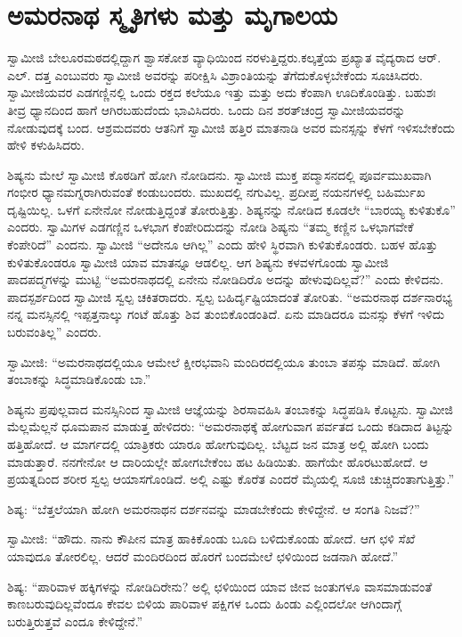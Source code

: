 
\chapter{ಅಮರನಾಥ ಸ್ಮೃತಿಗಳು ಮತ್ತು ಮೃಗಾಲಯ }

 ಸ್ವಾಮೀಜಿ ಬೇಲೂರಮಠದಲ್ಲಿದ್ದಾಗ ಶ್ವಾಸಕೋಶ ವ್ಯಾಧಿಯಿಂದ ನರಳುತ್ತಿದ್ದರು.\break ಕಲ್ಕತ್ತೆಯ ಪ್ರಖ್ಯಾತ ವೈದ್ಯರಾದ ಆರ್. ಎಲ್. ದತ್ತ ಎಂಬುವರು ಸ್ವಾಮೀಜಿ ಅವರನ್ನು ಪರೀಕ್ಷಿಸಿ ವಿಶ್ರಾಂತಿಯನ್ನು ತೆಗೆದುಕೊಳ್ಳಬೇಕೆಂದು ಸೂಚಿಸಿದರು. ಸ್ವಾಮೀಜಿಯವರ ಎಡಗಣ್ಣಿನಲ್ಲಿ ಒಂದು ರಕ್ತದ ಕಲೆಯೂ ಇತ್ತು ಮತ್ತು ಅದು ಕೆಂಪಾಗಿ ಊದಿಕೊಂಡಿತ್ತು. ಬಹುಶಃ ತೀವ್ರ ಧ್ಯಾನದಿಂದ ಹಾಗೆ ಆಗಿರಬಹುದೆಂದು ಭಾವಿಸಿದರು. ಒಂದು ದಿನ ಶರತ್‍ಚಂದ್ರ ಸ್ವಾಮೀಜಿಯವರನ್ನು ನೋಡುವುದಕ್ಕೆ ಬಂದ. ಆಶ್ರಮದವರು ಆತನಿಗೆ ಸ್ವಾಮೀಜಿ ಹತ್ತಿರ ಮಾತನಾಡಿ ಅವರ ಮನಸ್ಸನ್ನು ಕೆಳಗೆ ಇಳಿಸಬೇಕೆಂದು ಹೇಳಿ ಕಳುಹಿಸಿದರು. 

 ಶಿಷ್ಯನು ಮೇಲೆ ಸ್ವಾಮೀಜಿ ಕೊಠಡಿಗೆ ಹೋಗಿ ನೋಡಿದನು. ಸ್ವಾಮೀಜಿ ಮುಕ್ತ ಪದ್ಮಾಸನದಲ್ಲಿ ಪೂರ್ವಮುಖವಾಗಿ ಗಂಭೀರ ಧ್ಯಾನಮಗ್ನರಾಗಿರುವಂತೆ ಕಂಡುಬಂದರು. ಮುಖದಲ್ಲಿ ನಗುವಿಲ್ಲ. ಪ್ರದೀಪ್ತ ನಯನಗಳಲ್ಲಿ ಬಹಿರ್ಮುಖ ದೃಷ್ಟಿಯಿಲ್ಲ. ಒಳಗೆ ಏನೇನೋ ನೋಡುತ್ತಿದ್ದಂತೆ ತೋರುತ್ತಿತ್ತು. ಶಿಷ್ಯನನ್ನು ನೋಡಿದ ಕೂಡಲೇ “ಬಾರಯ್ಯ ಕುಳಿತುಕೊ” ಎಂದರು. ಸ್ವಾಮಿಗಳ ಎಡಗಣ್ಣಿನ ಒಳಭಾಗ ಕೆಂಪೇರಿದುದನ್ನು ನೋಡಿ ಶಿಷ್ಯನು “ತಮ್ಮ ಕಣ್ಣಿನ ಒಳಭಾಗವೇಕೆ ಕೆಂಪೇರಿದೆ” ಎಂದನು. ಸ್ವಾಮೀಜಿ “ಅದೇನೂ ಆಗಿಲ್ಲ” ಎಂದು ಹೇಳಿ ಸ್ಥಿರವಾಗಿ ಕುಳಿತುಕೊಂಡರು. ಬಹಳ ಹೊತ್ತು ಕುಳಿತುಕೊಂಡರೂ ಸ್ವಾಮೀಜಿ ಯಾವ ಮಾತನ್ನೂ ಆಡಲಿಲ್ಲ. ಆಗ ಶಿಷ್ಯನು ಕಳವಳಗೊಂಡು ಸ್ವಾಮೀಜಿ ಪಾದಪದ್ಮಗಳನ್ನು ಮುಟ್ಟಿ “ಅಮರನಾಥದಲ್ಲಿ ಏನೇನು ನೋಡಿದಿರೊ ಅದನ್ನು ಹೇಳುವುದಿಲ್ಲವೆ?” ಎಂದು ಕೇಳಿದನು. ಪಾದಸ್ಪರ್ಶದಿಂದ ಸ್ವಾಮೀಜಿ ಸ್ವಲ್ಪ ಚಕಿತರಾದರು. ಸ್ವಲ್ಪ ಬಹಿರ್ದೃಷ್ಟಿಯಾದಂತೆ ತೋರಿತು. “ಅಮರನಾಥ ದರ್ಶನಾರಭ್ಯ ನನ್ನ ಮನಸ್ಸಿನಲ್ಲಿ ಇಪ್ಪತ್ತನಾಲ್ಕು ಗಂಟೆ ಹೊತ್ತು ಶಿವ ತುಂಬಿಕೊಂಡಂತಿದೆ. ಏನು ಮಾಡಿದರೂ ಮನಸ್ಸು ಕೆಳಗೆ ಇಳಿದು ಬರುವಂತಿಲ್ಲ” ಎಂದರು. 

 ಸ್ವಾಮೀಜಿ: “ಅಮರನಾಥದಲ್ಲಿಯೂ ಆಮೇಲೆ ಕ್ಷೀರಭವಾನಿ ಮಂದಿರದಲ್ಲಿಯೂ ತುಂಬಾ ತಪಸ್ಸು ಮಾಡಿದೆ. ಹೋಗಿ ತಂಬಾಕನ್ನು ಸಿದ್ಧಮಾಡಿಕೊಂಡು ಬಾ.” 

 ಶಿಷ್ಯನು ಪ್ರಪುಲ್ಲವಾದ ಮನಸ್ಸಿನಿಂದ ಸ್ವಾಮೀಜಿ ಆಜ್ಞೆಯನ್ನು ಶಿರಸಾವಹಿಸಿ ತಂಬಾಕನ್ನು ಸಿದ್ಧಪಡಿಸಿ ಕೊಟ್ಟನು. ಸ್ವಾಮೀಜಿ ಮೆಲ್ಲಮೆಲ್ಲನೆ ಧೂಮಪಾನ ಮಾಡುತ್ತ ಹೇಳಿದರು: “ಅಮರನಾಥಕ್ಕೆ ಹೋಗುವಾಗ ಪರ್ವತದ ಒಂದು ಕಡಿದಾದ ತಿಟ್ಟನ್ನು ಹತ್ತಿಹೋದೆ. ಆ ಮಾರ್ಗದಲ್ಲಿ ಯಾತ್ರಿಕರು ಯಾರೂ ಹೋಗುವುದಿಲ್ಲ. ಬೆಟ್ಟದ ಜನ ಮಾತ್ರ ಅಲ್ಲಿ ಹೋಗಿ ಬಂದು ಮಾಡುತ್ತಾರೆ. ನನಗೇನೋ ಆ ದಾರಿಯಲ್ಲೇ ಹೋಗಬೇಕೆಂಬ ಹಟ ಹಿಡಿಯಿತು. ಹಾಗೆಯೇ ಹೊರಟುಹೋದೆ. ಆ ಪ್ರಯತ್ನದಿಂದ ಶರೀರ ಸ್ವಲ್ಪ ಆಯಾಸಗೊಂಡಿದೆ. ಅಲ್ಲಿ ಎಷ್ಟು ಕೊರೆತ ಎಂದರೆ ಮೈಯಲ್ಲಿ ಸೂಜಿ ಚುಚ್ಚಿದಂತಾಗುತ್ತಿತ್ತು.” 

 ಶಿಷ್ಯ: “ಬೆತ್ತಲೆಯಾಗಿ ಹೋಗಿ ಅಮರನಾಥನ ದರ್ಶನವನ್ನು ಮಾಡಬೇಕೆಂದು ಕೇಳಿದ್ದೇನೆ. ಆ ಸಂಗತಿ ನಿಜವೆ?” 

 ಸ್ವಾಮೀಜಿ: “ಹೌದು. ನಾನು ಕೌಪೀನ ಮಾತ್ರ ಹಾಕಿಕೊಂಡು ಬೂದಿ ಬಳಿದುಕೊಂಡು ಹೋದೆ. ಆಗ ಛಳಿ ಸೆಖೆ ಯಾವುದೂ ತೋರಲಿಲ್ಲ. ಆದರೆ ಮಂದಿರದಿಂದ ಹೊರಗೆ ಬಂದಮೇಲೆ ಛಳಿಯಿಂದ ಜಡನಾಗಿ ಹೋದೆ.” 

 ಶಿಷ್ಯ: “ಪಾರಿವಾಳ ಹಕ್ಕಿಗಳನ್ನು ನೋಡಿದಿರೇನು? ಅಲ್ಲಿ ಛಳಿಯಿಂದ ಯಾವ ಜೀವ ಜಂತುಗಳೂ ವಾಸಮಾಡುವಂತೆ ಕಾಣಬರುವುದಿಲ್ಲವೆಂದೂ ಕೇವಲ ಬಿಳಿಯ ಪಾರಿವಾಳ ಪಕ್ಷಿಗಳ ಒಂದು ಹಿಂಡು ಎಲ್ಲಿಂದಲೋ ಆಗಿಂದಾಗ್ಗೆ ಬರುತ್ತಿರುತ್ತವೆ ಎಂದೂ ಕೇಳಿದ್ದೇನೆ.” 

